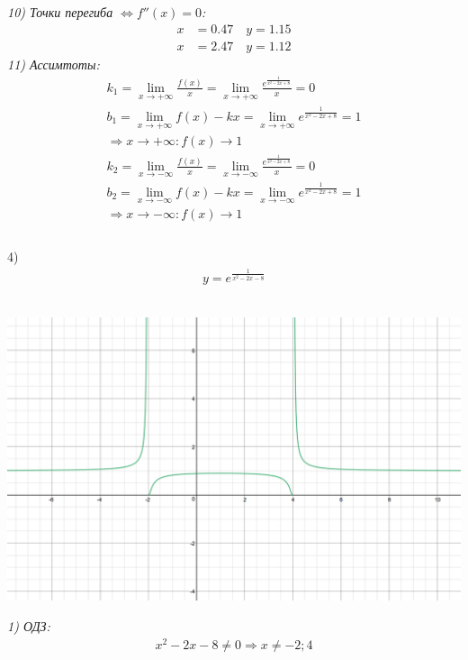 \documentclass[a4paper,11pt]{article}
\begin{document}
\noindent \textsl{10) Точки перегиба   $\Longleftrightarrow f''(x) = 0 $:}
\begin{align*}
x &= 0.47 \quad y = 1.15 \\[2pt]
x &= 2.47 \quad y = 1.12
\end{align*}
\noindent \textsl{11) Ассимтоты:}
\begin{gather*}
k_1 = \lim_{x \to +\infty} \frac{f(x)}{x} = \lim_{x \to +\infty} \frac{e^{\frac{1}{x^2 - 2x + 8}}}{x} = 0 \\
b_1 = \lim_{x \to +\infty} f(x) - kx = \lim_{x \to +\infty} e^{\frac{1}{x^2 - 2x + 8}} = 1 \\ 
\Rightarrow x \to +\infty: f(x) \to 1
\end{gather*}
\begin{gather*}
k_2 = \lim_{x \to -\infty} \frac{f(x)}{x} = \lim_{x \to -\infty} \frac{e^{\frac{1}{x^2 - 2x + 8}}}{x} = 0 \\
b_2 = \lim_{x \to -\infty} f(x) - kx = \lim_{x \to -\infty} e^{\frac{1}{x^2 - 2x + 8}} = 1 \\ 
\Rightarrow x \to -\infty: f(x) \to 1 \\ \\
\end{gather*}
\newpage





4)
\begin{align*}
y = e^{\frac{1}{x^2 - 2x - 8}}
\end{align*} \\
\begin{center}
	\includegraphics[width = 150mm]{images/741.png}
\end{center}

\noindent \textsl{1) ОДЗ:}
\begin{gather*}
x^2 - 2x - 8 \neq 0 \Rightarrow x \neq -2; 4
\end{gather*}
\end{document}
